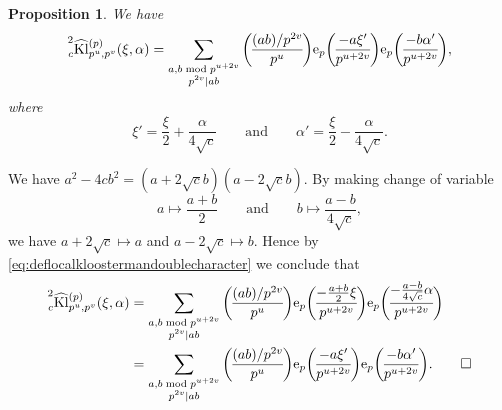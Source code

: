 \documentclass[10pt,oneside,reqno]{amsart}
\makeatletter
\newcommand\rme{\mathrm{e}}
\newcommand\Kl{\mathrm{Kl}}
\newcommand\legendresymbol[2]{\genfrac{(}{)}{}{}{#1}{#2}}
\theoremstyle{THEOREM}
\newtheorem{proposition}[theorem]{Proposition}
\theoremstyle{DEFINITION}
\theoremstyle{EXERCISE}
\numberwithin{equation}{section}
\renewenvironment{proof}[1][\proofname]{\par
  \vspace{-6pt}
  \pushQED{\qed}
  \normalfont \topsep6\p@\@plus6\p@\relax
  \trivlist
  \item[\hskip\labelsep\rmfamily\bfseries
    #1\@addpunct{:}]\ignorespaces
}{
  \popQED\endtrivlist\@endpefalse
  \vspace{-6pt}
}
\makeatother
\begin{document}
\begin{proposition}\label{prop:kloostermanlocalsplit}
We have
\[
\prescript{2}{c}{\widehat{\Kl}}_{p^u,p^v}^{(p)}(\xi,\alpha)=\sum_{\substack{a,b\bmod p^{u+2v}\\ p^{2v}\mid ab}}\legendresymbol{(ab)/p^{2v}}{p^u}\rme_p\legendresymbol{-a\xi'}{p^{u+2v}} \rme_p\legendresymbol{-b\alpha'}{p^{u+2v}},
\]
where
\[
\xi'=\frac{\xi}{2}+\frac{\alpha}{4\sqrt{c}}\qquad\text{and}\qquad \alpha'=\frac{\xi}{2}-\frac{\alpha}{4\sqrt{c}}.
\]
\end{proposition}
\begin{proof}
We have $a^2-4cb^2=(a+2\sqrt{c}b)(a-2\sqrt{c}b)$. By making change of variable
\[
a\mapsto\frac{a+b}{2}\qquad\text{and}\qquad b\mapsto\frac{a-b}{4\sqrt{c}},
\]
we have $a+2\sqrt{c}\mapsto a$ and $a-2\sqrt{c}\mapsto b$. Hence by \eqref{eq:deflocalkloostermandoublecharacter} we conclude that
\begin{align*}
\prescript{2}{c}{\widehat{\Kl}}_{p^u,p^v}^{(p)}(\xi,\alpha)&=\sum_{\substack{a,b\bmod p^{u+2v}\\ p^{2v}\mid ab}}\legendresymbol{(ab)/p^{2v}}{p^u}\rme_p\legendresymbol{-\frac{a+b}{2}\xi}{p^{u+2v}} \rme_p\legendresymbol{-\frac{a-b}{4\sqrt{c}}\alpha}{p^{u+2v}}\\
&=\sum_{\substack{a,b\bmod p^{u+2v}\\ p^{2v}\mid ab}}\legendresymbol{(ab)/p^{2v}}{p^u}\rme_p\legendresymbol{-a\xi'}{p^{u+2v}} \rme_p\legendresymbol{-b\alpha'}{p^{u+2v}}.\qedhere
\end{align*}
\end{proof}
\end{document}
